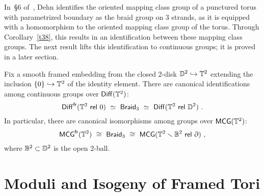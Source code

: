 In~\S6 of~\cite{Dehn}, 
Dehn
identifies the oriented mapping class group of a punctured torus with parametrized boundary as the braid group on 3 strands, as it is equipped with a homomorphism to the oriented mapping class group of the torus.  
Through Corollary~\ref{t38}, this results in an identification between these mapping class groups.  
The next result lifts this identification to continuous groups; it is proved in a later section.  




\begin{cor}
\label{t40}
Fix a smooth framed embedding from the closed 2-disk $\mathbb D^2 \hookrightarrow \mathbb T^2$ extending the inclusion $\{0\} \hookrightarrow \mathbb T^2$ of the identity element.
There are canonical identifications among continuous groups over $\operatorname{{\sf Diff}}(\mathbb T^2)$:
\[
\operatorname{{\sf Diff}}^{\operatorname{\sf fr}}(\mathbb T^2~{\sf rel}~0)
~
\simeq
~
\operatorname{{\sf Braid}_3}
~\simeq~
\operatorname{{\sf Diff}}(\mathbb T^2 ~{\sf rel}~ \mathbb D^2)
~.
\]
In particular, there are canonical isomorphisms among groups over ${\sf MCG}(\mathbb T^2)$:
\[
{\sf MCG}^{\operatorname{\sf fr}}(\mathbb T^2)
~\cong~
\operatorname{{\sf Braid}_3}
~\cong~
{\sf MCG}(\mathbb T^2 \smallsetminus \mathbb B^2 ~{\sf rel}~ \partial)
~,
\]
where $\mathbb B^2 \subset \mathbb D^2$ is the open 2-ball. 


\end{cor}

























































\section{Moduli and Isogeny of Framed Tori}




